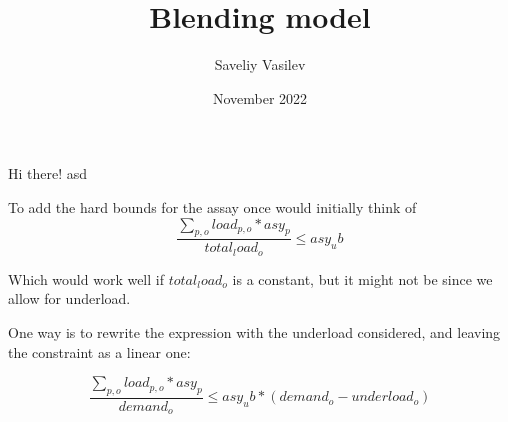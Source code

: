 \documentclass[12pt, a4paper]{article}
\title{Blending model}
\author{Saveliy Vasilev}
\date{November 2022}
\begin{document}
\maketitle
Hi there! asd

To add the hard bounds for the assay once would initially think of
$$
\frac{\sum_{p, o} load_{p, o} * asy_{p}}{total_load_o} \leq asy_ub
$$

Which would work well if $total_load_o$ is a constant, but it might not be since we allow for underload.

One way is to rewrite the expression with the underload considered, and leaving the constraint as a linear one:

$$
\frac{\sum_{p, o} load_{p, o} * asy_{p}}{demand_o} \leq asy_ub * (demand_o - underload_o)
$$
\end{document}
